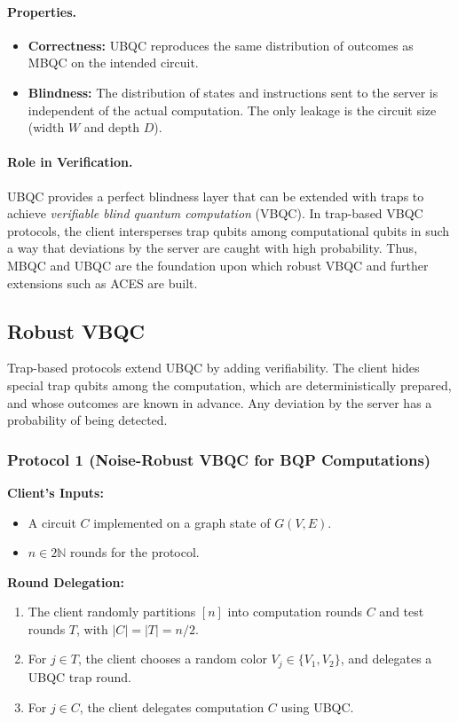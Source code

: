 \paragraph{Properties.}
\begin{itemize}
  \item \textbf{Correctness:} UBQC reproduces the same distribution of outcomes
        as MBQC on the intended circuit.
  \item \textbf{Blindness:} The distribution of states and instructions sent to
        the server is independent of the actual computation. The only leakage
        is the circuit size (width $W$ and depth $D$).
\end{itemize}

\paragraph{Role in Verification.}
UBQC provides a perfect blindness layer that can be extended with traps to
achieve \emph{verifiable blind quantum computation} (VBQC). In trap-based VBQC
protocols, the client intersperses trap qubits among computational qubits in
such a way that deviations by the server are caught with high probability.
Thus, MBQC and UBQC are the foundation upon which robust VBQC and further
extensions such as ACES are built.

\subsection{Robust VBQC}
Trap-based protocols extend UBQC by adding verifiability. The client hides
special trap qubits among the computation, which are deterministically
prepared, and whose outcomes are known in advance. Any deviation by the server
has a probability of being detected.

\subsubsection{Protocol 1 (Noise-Robust VBQC for BQP Computations)}
\textbf{Client's Inputs:} 
\begin{itemize}
  \item A circuit $C$ implemented on a graph state of $G(V, E)$.
  \item $n \in 2\mathbb{N}$ rounds for the protocol.
\end{itemize}

\noindent
\textbf{Round Delegation:}
\begin{enumerate}
  \item The client randomly partitions $[n]$ into computation rounds $C$ and
        test rounds $T$, with $|C|=|T|=n/2$.
  \item For $j \in T$, the client chooses a random color $V_j \in \{V_1,V_2\}$,
        and delegates a UBQC trap round.
  \item For $j \in C$, the client delegates computation $C$ using UBQC.
\end{enumerate}

